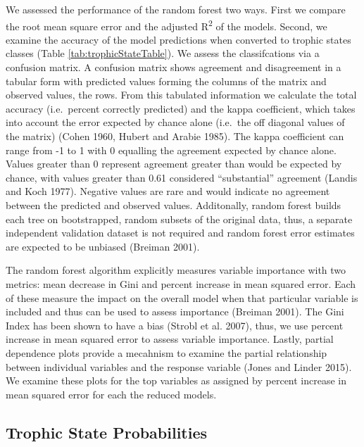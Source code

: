 \documentclass[12pt,]{article}
\begin{document}
We assessed the performance of the random forest two ways. First we
compare the root mean square error and the adjusted R\textsuperscript{2}
of the models. Second, we examine the accuracy of the model predictions
when converted to trophic states classes (Table
\ref{tab:trophicStateTable}). We assess the classifcations via a
confusion matrix. A confusion matrix shows agreement and disagreement in
a tabular form with predicted values forming the columns of the matrix
and observed values, the rows. From this tabulated information we
calculate the total accuracy (i.e.~percent correctly predicted) and the
kappa coefficient, which takes into account the error expected by chance
alone (i.e.~the off diagonal values of the matrix) (Cohen 1960, Hubert
and Arabie 1985). The kappa coefficient can range from -1 to 1 with 0
equalling the agreement expected by chance alone. Values greater than 0
represent agreement greater than would be expected by chance, with
values greater than 0.61 considered ``substantial'' agreement (Landis
and Koch 1977). Negative values are rare and would indicate no agreement
between the predicted and observed values. Additonally, random forest
builds each tree on bootstrapped, random subsets of the original data,
thus, a separate independent validation dataset is not required and
random forest error estimates are expected to be unbiased (Breiman
2001).

The random forest algorithm explicitly measures variable importance with
two metrics: mean decrease in Gini and percent increase in mean squared
error. Each of these measure the impact on the overall model when that
particular variable is included and thus can be used to assess
importance (Breiman 2001). The Gini Index has been shown to have a bias
(Strobl et al. 2007), thus, we use percent increase in mean squared
error to assess variable importance. Lastly, partial dependence plots
provide a mecahnism to examine the partial relationship between
individual variables and the response variable (Jones and Linder 2015).
We examine these plots for the top variables as assigned by percent
increase in mean squared error for each the reduced models.

\subsection{Trophic State
Probabilities}\label{trophic-state-probabilities}
\end{document}
